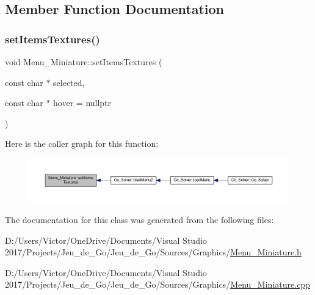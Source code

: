 \subsection{Member Function Documentation}
\mbox{\label{class_menu___miniature_afad04c066c7e436bbf9cccde310d07dc}} 
\subsubsection{\texorpdfstring{set\+Items\+Textures()}{setItemsTextures()}}
{\footnotesize\ttfamily void Menu\+\_\+\+Miniature\+::set\+Items\+Textures (\begin{DoxyParamCaption}\item[{const char $\ast$}]{selected,  }\item[{const char $\ast$}]{hover = {\ttfamily nullptr} }\end{DoxyParamCaption})\hspace{0.3cm}{\ttfamily [virtual]}}

Here is the caller graph for this function\+:
\nopagebreak
\begin{figure}[H]
\begin{center}
\leavevmode
\includegraphics[width=350pt]{class_menu___miniature_afad04c066c7e436bbf9cccde310d07dc_icgraph}
\end{center}
\end{figure}


The documentation for this class was generated from the following files\+:\begin{DoxyCompactItemize}
\item 
D\+:/\+Users/\+Victor/\+One\+Drive/\+Documents/\+Visual Studio 2017/\+Projects/\+Jeu\+\_\+de\+\_\+\+Go/\+Jeu\+\_\+de\+\_\+\+Go/\+Sources/\+Graphics/\hyperlink{_menu___miniature_8h}{Menu\+\_\+\+Miniature.\+h}\item 
D\+:/\+Users/\+Victor/\+One\+Drive/\+Documents/\+Visual Studio 2017/\+Projects/\+Jeu\+\_\+de\+\_\+\+Go/\+Jeu\+\_\+de\+\_\+\+Go/\+Sources/\+Graphics/\hyperlink{_menu___miniature_8cpp}{Menu\+\_\+\+Miniature.\+cpp}\end{DoxyCompactItemize}
